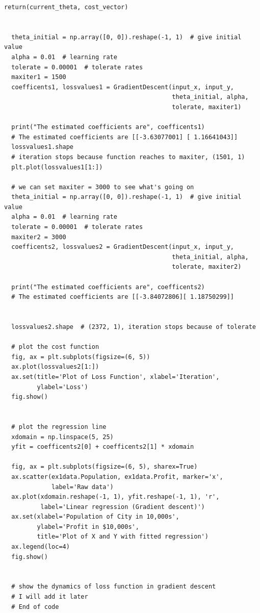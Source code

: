 \documentclass[12pt]{article}
\theoremstyle{definition}
\numberwithin{equation}{section}
\numberwithin{figure}{section}
\numberwithin{table}{section}
\begin{document}
\begin{lstlisting}[caption = Gradient Descent Regression]
      return(current_theta, cost_vector)


  theta_initial = np.array([0, 0]).reshape(-1, 1)  # give initial value
  alpha = 0.01  # learning rate
  tolerate = 0.00001  # tolerate rates
  maxiter1 = 1500
  coefficents1, lossvalues1 = GradientDescent(input_x, input_y,
                                              theta_initial, alpha,
                                              tolerate, maxiter1)

  print("The estimated coefficients are", coefficents1)
  # The estimated coefficients are [[-3.63077001] [ 1.16641043]]
  lossvalues1.shape
  # iteration stops because function reaches to maxiter, (1501, 1)
  plt.plot(lossvalues1[1:])

  # we can set maxiter = 3000 to see what's going on
  theta_initial = np.array([0, 0]).reshape(-1, 1)  # give initial value
  alpha = 0.01  # learning rate
  tolerate = 0.00001  # tolerate rates
  maxiter2 = 3000
  coefficents2, lossvalues2 = GradientDescent(input_x, input_y,
                                              theta_initial, alpha,
                                              tolerate, maxiter2)

  print("The estimated coefficients are", coefficents2)
  # The estimated coefficients are [[-3.84072806][ 1.18750299]]


  lossvalues2.shape  # (2372, 1), iteration stops because of tolerate

  # plot the cost function
  fig, ax = plt.subplots(figsize=(6, 5))
  ax.plot(lossvalues2[1:])
  ax.set(title='Plot of Loss Function', xlabel='Iteration',
         ylabel='Loss')
  fig.show()


  # plot the regression line
  xdomain = np.linspace(5, 25)
  yfit = coefficents2[0] + coefficents2[1] * xdomain

  fig, ax = plt.subplots(figsize=(6, 5), sharex=True)
  ax.scatter(ex1data.Population, ex1data.Profit, marker='x',
             label='Raw data')
  ax.plot(xdomain.reshape(-1, 1), yfit.reshape(-1, 1), 'r',
          label='Linear regression (Gradient descent)')
  ax.set(xlabel='Population of City in 10,000s',
         ylabel='Profit in $10,000s',
         title='Plot of X and Y with fitted regression')
  ax.legend(loc=4)
  fig.show()


  # show the dynamics of loss function in gradient descent
  # I will add it later
  # End of code
\end{lstlisting}






















\newpage


\end{document}
